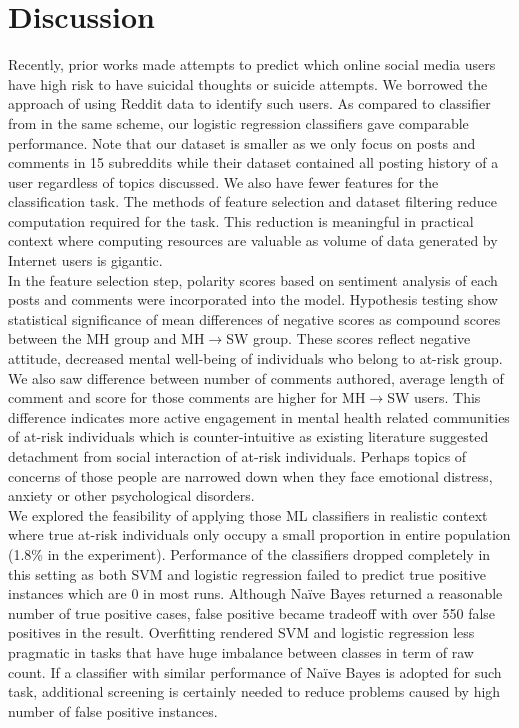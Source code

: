 \section{Discussion}
Recently, prior works \cite{Coppersmith2016, DeChoudhury2016} made attempts to predict which online social media users have high risk to have suicidal thoughts or suicide attempts. We borrowed the approach of using Reddit data to identify such users. As compared to classifier from \cite{DeChoudhury2016} in the same scheme, our logistic regression classifiers gave comparable performance. Note that our dataset is smaller as we only focus on posts and comments in 15 subreddits while their dataset contained all posting history of a user regardless of topics discussed. We also have fewer features for the classification task. The methods of feature selection and dataset filtering reduce computation required for the task. This reduction is meaningful in practical context where computing resources are valuable as volume of data generated by Internet users is gigantic.\\
In the feature selection step, polarity scores based on sentiment analysis of each posts and comments were incorporated into the model. Hypothesis testing show statistical significance of mean differences of negative scores as compound scores between the MH group and MH$\rightarrow$SW group. These scores reflect negative attitude, decreased mental well-being of individuals who belong to at-risk group. We also saw difference between number of comments authored, average length of comment and score for those comments are higher for MH$\rightarrow$SW users. This difference indicates more active engagement in mental health related communities of at-risk individuals which is counter-intuitive as existing literature \cite{Coppersmith2014} suggested detachment from social interaction of at-risk individuals. Perhaps topics of concerns of those people are narrowed down when they face emotional distress, anxiety or other psychological disorders.\\
We explored the feasibility of applying those ML classifiers in realistic context where true at-risk individuals only occupy a small proportion in entire population (1.8\% in the experiment). Performance of the classifiers dropped completely in this setting as both SVM and logistic regression failed to predict true positive instances which are 0 in most runs. Although Na\"ive Bayes returned a reasonable number of true positive cases, false positive became tradeoff with over 550 false positives in the result. Overfitting rendered SVM and logistic regression less pragmatic in tasks that have huge imbalance between classes in term of raw count. If a classifier with similar performance of  Na\"ive Bayes is adopted for such task, additional screening is certainly needed to reduce problems caused by high number of false positive instances.\\
